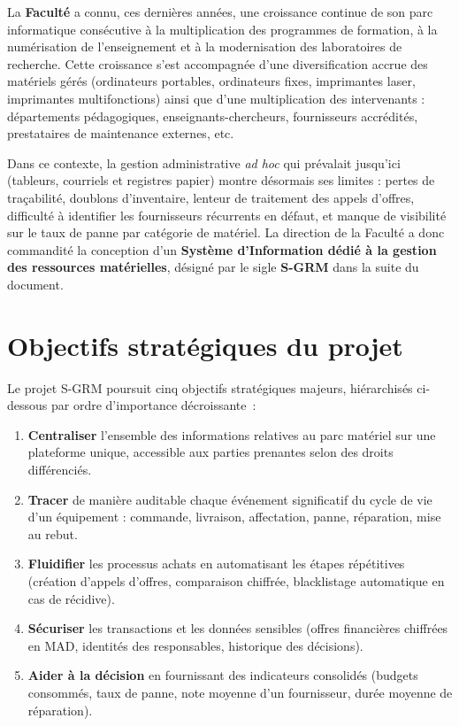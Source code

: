 \documentclass[a4paper,11pt,openany]{report}
\newcommand{\mad}{MAD}
\begin{document}
La \textbf{Faculté} a connu, ces dernières années, une croissance
continue de son parc informatique consécutive à la multiplication
des programmes de formation, à la numérisation de l'enseignement
et à la modernisation des laboratoires de recherche. Cette
croissance s'est accompagnée d'une diversification accrue des
matériels gérés (ordinateurs portables, ordinateurs fixes,
imprimantes laser, imprimantes multifonctions) ainsi que d'une
multiplication des intervenants : départements pédagogiques,
enseignants-chercheurs, fournisseurs accrédités, prestataires de
maintenance externes, etc.

Dans ce contexte, la gestion administrative \emph{ad hoc} qui
prévalait jusqu'ici (tableurs, courriels et registres papier)
montre désormais ses limites : pertes de traçabilité, doublons
d'inventaire, lenteur de traitement des appels d'offres,
difficulté à identifier les fournisseurs récurrents en défaut, et
manque de visibilité sur le taux de panne par catégorie de
matériel. La direction de la Faculté a donc commandité la
conception d'un \textbf{Système d'Information dédié à la gestion
des ressources matérielles}, désigné par le sigle \textbf{S-GRM}
dans la suite du document.

\section{Objectifs stratégiques du projet}

Le projet S-GRM poursuit cinq objectifs stratégiques majeurs,
hiérarchisés ci-dessous par ordre d'importance décroissante~:

\begin{enumerate}[leftmargin=*]
  \item \textbf{Centraliser} l'ensemble des informations relatives
    au parc matériel sur une plateforme unique, accessible aux
    parties prenantes selon des droits différenciés.
  \item \textbf{Tracer} de manière auditable chaque événement
    significatif du cycle de vie d'un équipement : commande,
    livraison, affectation, panne, réparation, mise au rebut.
  \item \textbf{Fluidifier} les processus achats en automatisant
    les étapes répétitives (création d'appels d'offres, comparaison
    chiffrée, blacklistage automatique en cas de récidive).
  \item \textbf{Sécuriser} les transactions et les données
    sensibles (offres financières chiffrées en \mad, identités
    des responsables, historique des décisions).
  \item \textbf{Aider à la décision} en fournissant des
    indicateurs consolidés (budgets consommés, taux de panne,
    note moyenne d'un fournisseur, durée moyenne de réparation).
\end{enumerate}
\end{document}
